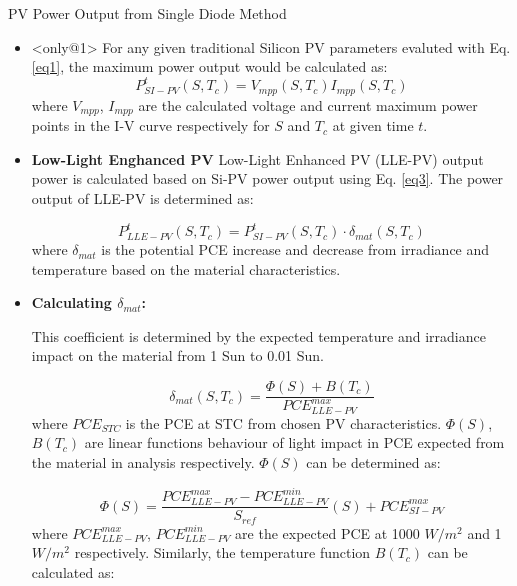 \begin{frame}[c]{PV Power Output from Single Diode Method}

    \begin{itemize}
        \item<only@{1}>        For any given traditional Silicon PV parameters evaluted with Eq. \ref{eq1}, the maximum power output would be calculated as:
        \begin{equation}\label{eq3}
            P_{SI-PV}^t(S,T_c) = V_{mpp}(S,T_c)I_{mpp}(S,T_c)
        \end{equation}
        where \(V_{mpp}\), \(I_{mpp}\) are the calculated voltage and current maximum power points in the I-V curve respectively for \(S\) and \(T_c\) at given time \(t\).

        \item<only@2> \textbf{Low-Light Enghanced PV} 
            Low-Light Enhanced PV (LLE-PV) output power is calculated based on Si-PV power output using Eq. \ref{eq3}. The power output of LLE-PV is determined as:
            
            \begin{equation}\label{eq4}
                P_{LLE-PV}^t(S,T_c) = P_{SI-PV}^t(S,T_c) \cdot \delta_{mat}(S,T_c)
            \end{equation}
            where \(\delta_{mat}\) is the potential PCE increase and decrease from irradiance and temperature based on the material characteristics.

        \item<only@3> \textbf{Calculating \(\delta_{mat}\):}

            This coefficient is determined by the expected temperature and irradiance impact on the material from 1 Sun to 0.01 Sun. 

            \begin{equation}\label{eq5}
                \delta_{mat}(S, T_c) = \frac{\Phi(S) + B(T_c)}{PCE_{LLE-PV}^{max}} 
            \end{equation}
            where \(PCE_{STC}\) is the PCE at STC from chosen PV characteristics. \(\Phi(S)\), \(B(T_c)\) are linear functions behaviour of light impact 
            in PCE expected from the material in analysis respectively. \(\Phi(S)\) can be determined as:

            \begin{equation}\label{eq4}
                \Phi(S) = \frac{PCE_{LLE-PV}^{max} - PCE_{LLE-PV}^{min}}{S_{ref}}(S) + PCE_{SI-PV}^{max}
            \end{equation}
            where \(PCE_{LLE-PV}^{max}\), \(PCE_{LLE-PV}^{min}\) are the expected PCE at 1000 \(W/m^2\) and 1 \(W/m^2\) respectively. Similarly, the temperature function \(B(T_c)\)
            can be calculated as:


\end{itemize}
\end{frame}
